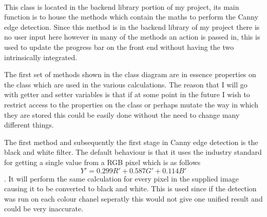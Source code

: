 \begin{FlushLeft}
    \begin{figure}[H]
        \centering
    \end{figure}\\

    This class is located in the backend library portion of my project, its main function is to house the methods which contain the maths to perform the Canny edge detection. Since this method is in the backend library of my project there is no user input here however in many of the methods an action is passed in, this is used to update the progress bar on the front end without having the two intrinsically integrated. \\ \bk

    The first set of methods shown in the class diagram are in essence properties on the class which are used in the various calculations. The reason that I will go with getter and setter variables is that if at some point in the future I wish to restrict access to the properties on the class or perhaps mutate the way in which they are stored this could be easily done without the need to change many different things. \\ \bk

    The first method and subsequently the first stage in Canny edge detection is the black and white filter. The default behaviour is that it uses the industry standard for getting a single value from a RGB pixel which is as follows $$ Y' = 0.299R' + 0.587G' + 0.114B' $$.  It will perform the same calculation for every pixel in the supplied image causing it to be converted to black and white. This is used since if the detection was run on each colour chanel seperatly this would not give one unified result and could be very inaccurate.\\ 


\end{FlushLeft}
